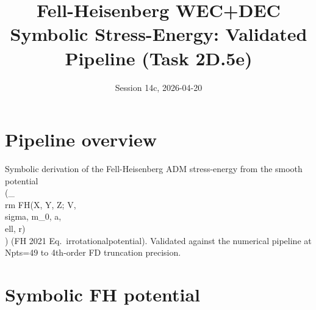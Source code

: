 \documentclass{article}
\title{Fell-Heisenberg WEC+DEC Symbolic Stress-Energy: Validated Pipeline (Task 2D.5e)}
\date{Session 14c, 2026-04-20}
\begin{document}
\maketitle
\section{Pipeline overview}
Symbolic derivation of the Fell-Heisenberg ADM stress-energy from the smooth potential
\\(\phi_{\\rm FH}(X, Y, Z; V, \\sigma, m_0, a, \\ell, r)\\) (FH 2021 Eq.~irrotationalpotential).
Validated against the numerical pipeline at Npts=49 to 4th-order FD truncation precision.
\section{Symbolic FH potential}
\\[ \\phi = \frac{V \left(\sqrt{\pi} \sqrt{\sigma} \left(- 2 m_{0} \sqrt{X^{2} + Y^{2} + Z^{2}} \operatorname{erf}{\left(\frac{\sqrt{X^{2} + Y^{2} + Z^{2}}}{\sqrt{\sigma}} \right)} + \left(- a \tanh{\left(\frac{Z}{\ell} \right)} + m_{0}\right) \left(\left(a \tanh{\left(\frac{Z}{\ell} \right)} + m_{0}\right) \sqrt{X^{2} + Y^{2} + Z^{2}} - \sqrt[4]{X^{2} + Y^{2} + Z^{2}}\right) \operatorname{erf}{\left(\frac{r - \frac{\sqrt[4]{X^{2} + Y^{2} + Z^{2}}}{a \tanh{\left(\frac{Z}{\ell} \right)} + m_{0}}}{\sqrt{\sigma}} \right)} + \left(a \tanh{\left(\frac{Z}{\ell} \right)} + m_{0}\right) \left(\left(- a \tanh{\left(\frac{Z}{\ell} \right)} + m_{0}\right) \sqrt{X^{2} + Y^{2} + Z^{2}} - \sqrt[4]{X^{2} + Y^{2} + Z^{2}}\right) \operatorname{erf}{\left(\frac{r + \frac{\sqrt[4]{X^{2} + Y^{2} + Z^{2}}}{- a \tanh{\left(\frac{Z}{\ell} \right)} + m_{0}}}{\sqrt{\sigma}} \right)}\right) + \sigma \left(- 2 m_{0} e^{\frac{- X^{2} - Y^{2} - Z^{2}}{\sigma}} + \left(- a \tanh{\left(\frac{Z}{\ell} \right)} + m_{0}\right) \left(a \tanh{\left(\frac{Z}{\ell} \right)} + m_{0}\right) e^{- \frac{\left(r - \frac{\sqrt[4]{X^{2} + Y^{2} + Z^{2}}}{a \tanh{\left(\frac{Z}{\ell} \right)} + m_{0}}\right)^{2}}{\sigma}} + \left(- a \tanh{\left(\frac{Z}{\ell} \right)} + m_{0}\right) \left(a \tanh{\left(\frac{Z}{\ell} \right)} + m_{0}\right) e^{- \frac{\left(r + \frac{\sqrt[4]{X^{2} + Y^{2} + Z^{2}}}{- a \tanh{\left(\frac{Z}{\ell} \right)} + m_{0}}\right)^{2}}{\sigma}}\right)\right)}{2 m_{0}} \\]
\end{document}
